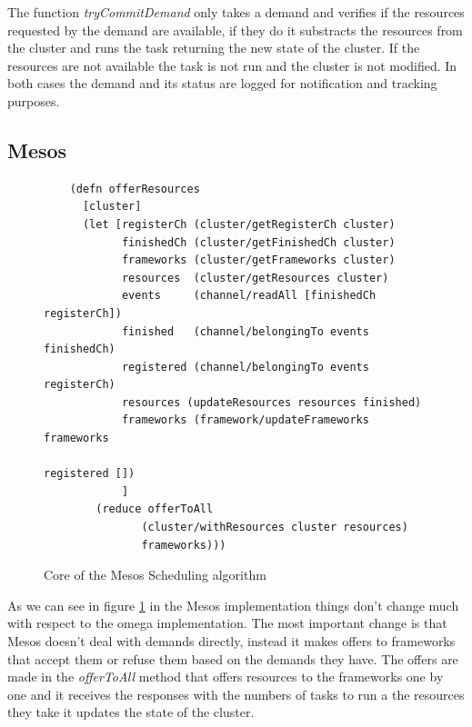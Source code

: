 \documentclass{report}                     %
\begin{document}
The function \emph{tryCommitDemand} only takes a demand and verifies
if the resources requested by the demand are available, if they do it
substracts the resources from the cluster and runs the task returning
the new state of the cluster. If the resources are not available the
task is not run and the cluster is not modified. In both cases the
demand and its status are logged for notification and tracking
purposes. 


\subsection{Mesos}

\begin{figure}[!ht]
\centering
\begin{verbatim}
    (defn offerResources
      [cluster]
      (let [registerCh (cluster/getRegisterCh cluster) 
            finishedCh (cluster/getFinishedCh cluster) 
            frameworks (cluster/getFrameworks cluster)
            resources  (cluster/getResources cluster)
            events     (channel/readAll [finishedCh registerCh])
            finished   (channel/belongingTo events finishedCh)
            registered (channel/belongingTo events registerCh)
            resources (updateResources resources finished)
            frameworks (framework/updateFrameworks frameworks
                                                   registered [])
            ]
        (reduce offerToAll
               (cluster/withResources cluster resources)
               frameworks)))

\end{verbatim}
\caption{Core of the Mesos Scheduling algorithm}
\label{fig:mesos-implementation}
\end{figure}

As we can see in figure \ref{fig:mesos-implementation} in the Mesos
implementation things don't change much with respect to the omega
implementation. The most important change is that Mesos doesn't deal
with demands directly, instead it makes offers to frameworks that
accept them or refuse them based on the demands they have. The offers
are made in the \emph{offerToAll} method that offers resources to the
frameworks one by one and it receives the responses with the numbers
of tasks to run a the resources they take it updates the state of the
cluster.
\end{document}
